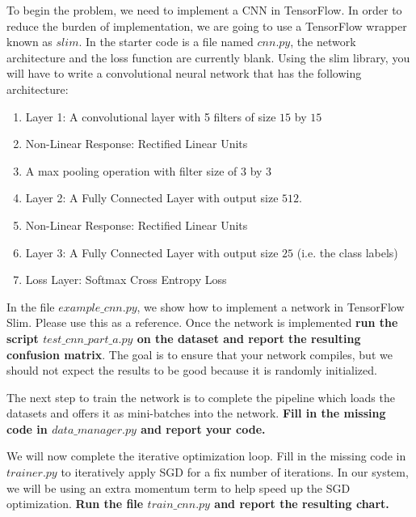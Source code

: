 \documentclass[preview]{standalone}
\begin{document}
\begin{Parts}
\Part To begin the problem, we need to implement a CNN in TensorFlow. In order to reduce the burden of implementation, we are going to use a TensorFlow wrapper known as $slim$.   In the starter code is a file named $cnn.py$, the network architecture and the loss function are currently blank. Using the slim library, you will have to write a convolutional neural network that has the following architecture:

\begin{enumerate}
\item Layer 1: A convolutional layer with 5 filters of size $15$ by $15$
\item Non-Linear Response: Rectified Linear Units
\item A max pooling operation with filter size of $3$ by $3$
\item Layer 2: A Fully Connected Layer with output size $512$.
\item Non-Linear Response: Rectified Linear Units
\item Layer 3: A Fully Connected Layer with output size $25$ (i.e. the class labels)
\item Loss Layer: Softmax Cross Entropy Loss
\end{enumerate}


In the file $example\_cnn.py$, we show how to implement a network in TensorFlow Slim. Please use this as a reference. Once the network is implemented {\bf run the script $test\_cnn\_part\_a.py$ on the dataset and report the resulting confusion matrix}.  The goal is to ensure that your network compiles, but we should not expect the results to be good because it is randomly initialized.







\Part The next step to train the network is to complete the pipeline which loads the datasets and offers it as mini-batches into the network. {\bf Fill in the missing code in $data\_manager.py$ and report your code.}



\Part We will now complete the iterative optimization loop. Fill in the missing code in $trainer.py$ to iteratively apply SGD for a fix number of iterations. In our system, we will be using an extra momentum term to help speed up the SGD optimization.  {\bf Run the file $train\_cnn.py$ and report the resulting chart.}





\end{Parts}
\end{document}
